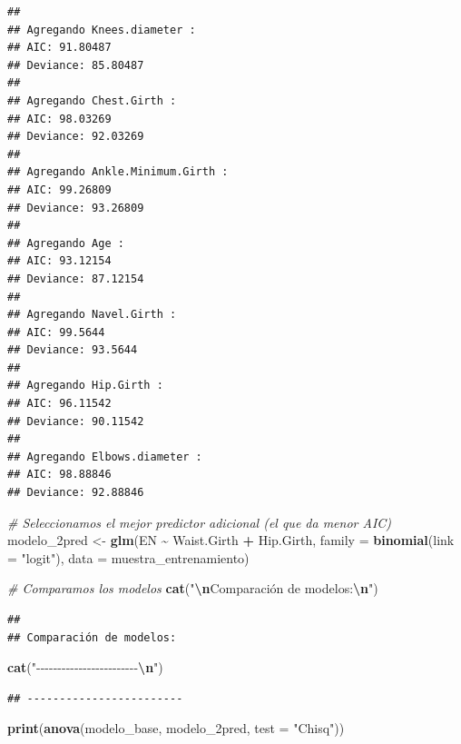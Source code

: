 \documentclass[
]{article}
\newenvironment{Shaded}{\begin{snugshade}}{\end{snugshade}}
\newcommand{\AttributeTok}[1]{\textcolor[rgb]{0.13,0.29,0.53}{#1}}
\newcommand{\CommentTok}[1]{\textcolor[rgb]{0.56,0.35,0.01}{\textit{#1}}}
\newcommand{\FunctionTok}[1]{\textcolor[rgb]{0.13,0.29,0.53}{\textbf{#1}}}
\newcommand{\NormalTok}[1]{#1}
\newcommand{\OtherTok}[1]{\textcolor[rgb]{0.56,0.35,0.01}{#1}}
\newcommand{\SpecialCharTok}[1]{\textcolor[rgb]{0.81,0.36,0.00}{\textbf{#1}}}
\newcommand{\StringTok}[1]{\textcolor[rgb]{0.31,0.60,0.02}{#1}}
\begin{document}
\begin{verbatim}
## 
## Agregando Knees.diameter :
## AIC: 91.80487 
## Deviance: 85.80487 
## 
## Agregando Chest.Girth :
## AIC: 98.03269 
## Deviance: 92.03269 
## 
## Agregando Ankle.Minimum.Girth :
## AIC: 99.26809 
## Deviance: 93.26809 
## 
## Agregando Age :
## AIC: 93.12154 
## Deviance: 87.12154 
## 
## Agregando Navel.Girth :
## AIC: 99.5644 
## Deviance: 93.5644 
## 
## Agregando Hip.Girth :
## AIC: 96.11542 
## Deviance: 90.11542 
## 
## Agregando Elbows.diameter :
## AIC: 98.88846 
## Deviance: 92.88846
\end{verbatim}

\begin{Shaded}
\begin{Highlighting}[]
\CommentTok{\# Seleccionamos el mejor predictor adicional (el que da menor AIC)}
\NormalTok{modelo\_2pred }\OtherTok{\textless{}{-}} \FunctionTok{glm}\NormalTok{(EN }\SpecialCharTok{\textasciitilde{}}\NormalTok{ Waist.Girth }\SpecialCharTok{+}\NormalTok{ Hip.Girth, }
                   \AttributeTok{family =} \FunctionTok{binomial}\NormalTok{(}\AttributeTok{link =} \StringTok{"logit"}\NormalTok{), }
                   \AttributeTok{data =}\NormalTok{ muestra\_entrenamiento)}

\CommentTok{\# Comparamos los modelos}
\FunctionTok{cat}\NormalTok{(}\StringTok{"}\SpecialCharTok{\textbackslash{}n}\StringTok{Comparación de modelos:}\SpecialCharTok{\textbackslash{}n}\StringTok{"}\NormalTok{)}
\end{Highlighting}
\end{Shaded}

\begin{verbatim}
## 
## Comparación de modelos:
\end{verbatim}

\begin{Shaded}
\begin{Highlighting}[]
\FunctionTok{cat}\NormalTok{(}\StringTok{"{-}{-}{-}{-}{-}{-}{-}{-}{-}{-}{-}{-}{-}{-}{-}{-}{-}{-}{-}{-}{-}{-}{-}{-}}\SpecialCharTok{\textbackslash{}n}\StringTok{"}\NormalTok{)}
\end{Highlighting}
\end{Shaded}

\begin{verbatim}
## ------------------------
\end{verbatim}

\begin{Shaded}
\begin{Highlighting}[]
\FunctionTok{print}\NormalTok{(}\FunctionTok{anova}\NormalTok{(modelo\_base, modelo\_2pred, }\AttributeTok{test =} \StringTok{"Chisq"}\NormalTok{))}
\end{Highlighting}
\end{Shaded}
\end{document}

